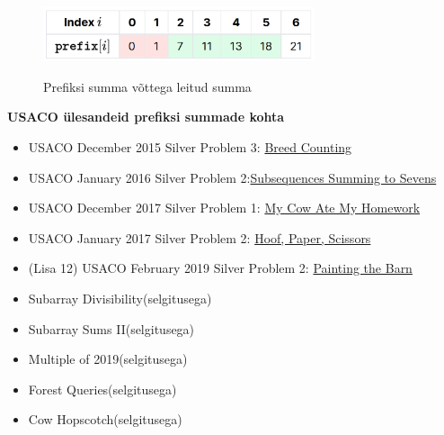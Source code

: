 \documentclass{trkut}
\begin{document}
\begin{appendices}
\begin{figure}[H]%
    \includegraphics[width=8cm]{PrefiksMassiiv2.png}%
    \caption{Prefiksi summa võttega leitud summa}%
    \label{EMaxx}%
\end{figure}


\textbf{USACO ülesandeid prefiksi summade kohta}

\begin{itemize}
    \item USACO December 2015 Silver Problem 3: \href{http://usaco.org/index.php?page=viewproblem2&cpid=572}{Breed Counting} 
    \item USACO January 2016 Silver Problem 2:\href{http://usaco.org/index.php?page=viewproblem2&cpid=595}{Subsequences Summing to Sevens} 
    \item USACO December 2017 Silver Problem 1: \href{http://www.usaco.org/index.php?page=viewproblem2&cpid=762}{My Cow Ate My Homework} 
    \item USACO January 2017 Silver Problem 2: \href{http://www.usaco.org/index.php?page=viewproblem2&cpid=691}{Hoof, Paper, Scissors} 
    \item (Lisa 12) USACO February 2019 Silver Problem 2: \href{http://www.usaco.org/index.php?page=viewproblem2&cpid=919}{Painting the Barn} 
    \item Subarray Divisibility(selgitusega)
    \item Subarray Sums II(selgitusega)
    \item Multiple of 2019(selgitusega)
    \item Forest Queries(selgitusega)
    \item Cow Hopscotch(selgitusega)
\end{itemize}



\end{appendices}
\end{document}
